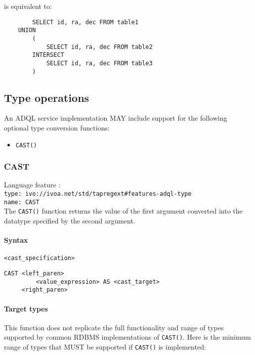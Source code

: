 \documentclass[11pt,a4paper]{ivoa}
\begin{document}
is equivalent to:

\begin{verbatim}
        SELECT id, ra, dec FROM table1
    UNION
        (
            SELECT id, ra, dec FROM table2
        INTERSECT
            SELECT id, ra, dec FROM table3
        )
\end{verbatim}

\subsection{Type operations}
\label{sec:type}

An ADQL service implementation MAY include support for the following optional
type conversion functions:

\begin{itemize}
    \item \verb:CAST():
\end{itemize}

\subsubsection{CAST}
\label{sec:type.cast}
{\footnotesize Language feature :}\\
{\footnotesize \verb|type: ivo://ivoa.net/std/tapregext#features-adql-type|}\\
{\footnotesize \verb|name: CAST|}\\

The \verb:CAST(): function returns the value of the first argument converted
into the datatype specified by the second argument.

\paragraph{Syntax} \verb:<cast_specification>:
\begin{verbatim}
CAST <left_paren>
         <value_expression> AS <cast_target>
     <right_paren>
\end{verbatim}

\paragraph{Target types}

This function does not replicate the full functionality and range of types
supported by common RDBMS implementations of \verb:CAST():. Here is the minimum
range of types that MUST be supported if \verb:CAST(): is implemented:
\end{document}
